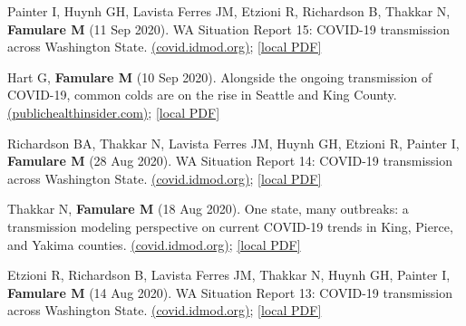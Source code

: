 \documentclass{article}
\begin{document}
\begin{llist}
\begin{items}
	\item[{[34]}] Painter I,  Huynh GH, Lavista Ferres JM, Etzioni R, Richardson B, Thakkar N,  \textbf{Famulare M} (11 Sep 2020). WA Situation Report 15: COVID-19 transmission across Washington State. \href{https://iazpvnewgrp01.blob.core.windows.net/source/2021-02/reports/pdf/WA_Situation_Report_15_COVID-19_transmission_across_Washington_State.pdf}{(covid.idmod.org)}; \href{https://famulare.github.io/assets/publication-mirror/WA_Situation_Report_15_COVID-19_transmission_across_Washington_State.pdf}{[local PDF]}
	
	\item[{[33]}] Hart G, \textbf{Famulare M} (10 Sep 2020). Alongside the ongoing transmission of COVID-19, common colds are on the rise in Seattle and King County. \href{https://publichealthinsider.com/2020/09/10/alongside-the-ongoing-transmission-of-covid-19-common-colds-are-on-the-rise-in-seattle-and-king-county/}{(publichealthinsider.com)}; \href{https://famulare.github.io/assets/publication-mirror/Alongside%20the%20ongoing%20transmission%20of%20COVID-19,%20common%20colds%20are%20on%20the%20rise%20in%20Seattle%20and%20King%20County%20%E2%80%93%20PUBLIC%20HEALTH%20INSIDER.pdf}{[local PDF]}
	
	\item[{[32]}] Richardson BA, Thakkar N, Lavista Ferres JM, Huynh GH, Etzioni R, Painter I,  \textbf{Famulare M} (28 Aug 2020). WA Situation Report 14: COVID-19 transmission across Washington State. \href{https://iazpvnewgrp01.blob.core.windows.net/source/2021-02/reports/pdf/WA_Situation_Report_14_COVID-19_transmission_across_Washington_State.pdf}{(covid.idmod.org)}; \href{https://famulare.github.io/assets/publication-mirror/WA_Situation_Report_14_COVID-19_transmission_across_Washington_State.pdf}{[local PDF]}
	
	\item[{[31]}] Thakkar N, \textbf{Famulare M} (18 Aug 2020). One state, many outbreaks: a transmission modeling perspective on current COVID-19 trends in King, Pierce, and Yakima counties. \href{https://iazpvnewgrp01.blob.core.windows.net/source/2021-02/reports/pdf/One_state_many_outbreaks.pdf}{(covid.idmod.org)}; \href{https://famulare.github.io/assets/publication-mirror/One_state_many_outbreaks.pdf}{[local PDF]}
	
	\item[{[30]}] Etzioni R, Richardson B, Lavista Ferres JM, Thakkar N, Huynh GH, Painter I,  \textbf{Famulare M} (14 Aug 2020). WA Situation Report 13: COVID-19 transmission across Washington State. \href{https://iazpvnewgrp01.blob.core.windows.net/source/2021-02/reports/pdf/WA_Situation_Report_13_COVID-19_transmission_across_Washington_State.pdf}{(covid.idmod.org)}; \href{https://famulare.github.io/assets/publication-mirror/WA_Situation_Report_13_COVID-19_transmission_across_Washington_State.pdf}{[local PDF]}
	

\end{items}
\end{llist}
\end{document}
